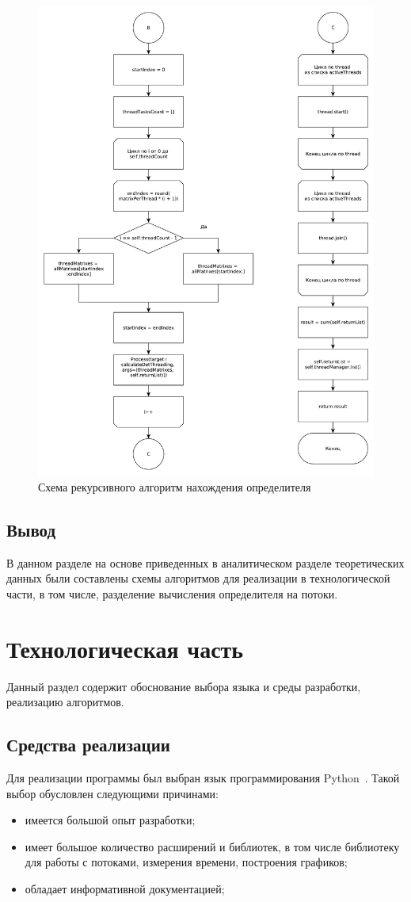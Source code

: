 \documentclass[a4paper,oneside,14pt]{extreport}
\begin{document}
\begin{figure}[H]
	\centering
	\includegraphics[width=0.90\linewidth]{images/solver_part_2}
	\caption{Схема рекурсивного алгоритм нахождения определителя}
	\label{img:solver_2}
\end{figure}

\section{Вывод}
В данном разделе на основе приведенных в аналитическом разделе теоретических данных были составлены схемы алгоритмов для реализации в технологической части, в том числе, разделение вычисления определителя на потоки. 

\chapter{Технологическая часть}
Данный раздел содержит обоснование выбора языка и среды разработки, реализацию алгоритмов.

\section{Средства реализации}
Для реализации программы был выбран язык программирования Python~\cite{python}. Такой выбор обусловлен следующими причинами:
\begin{itemize}
	\item имеется большой опыт разработки;
	\item имеет большое количество расширений и библиотек, в том числе библиотеку для работы с потоками, измерения времени, построения графиков;
	\item обладает информативной документацией;
\end{itemize}
\end{document}
